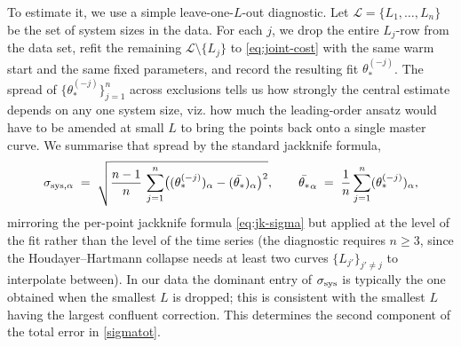 \documentclass[pra,aps,twocolumn,groupedaddress,superscriptaddress,nofootinbib,preprintnumbers]{revtex4-2}
\begin{document}
\begin{widetext}
		To estimate it, we use a simple leave-one-$L$-out
		diagnostic. Let $\mathcal{L} = \{L_1,\dots,L_n\}$ be the set of system
		sizes in the data. For each $j$, we drop the entire $L_j$-row from
		the data set, refit the remaining $\mathcal{L}\setminus\{L_j\}$ to
		\eqref{eq:joint-cost} with the same warm start and the same fixed
		parameters, and record the resulting fit
		$\theta_*^{(-j)}$. The spread of $\{\theta_*^{(-j)}\}_{j=1}^n$
		across exclusions tells us how strongly the central estimate depends
		on any one system size, viz. how much the leading-order ansatz
		would have to be amended at small $L$ to bring the points back onto a
		single master curve. We summarise that spread by the standard
		jackknife formula,
		\begin{equation}
			\sigma_{{\rm sys},\alpha}
			\;=\;
			\sqrt{
				\frac{n - 1}{n}\,
				\sum_{j=1}^{n}\bigl((\theta_*^{(-j)})_\alpha
				- (\bar{\theta_*})_\alpha\bigr)^2
			},
			\qquad
			\bar{\theta_*}_\alpha
			\;=\; \frac{1}{n}\sum_{j=1}^{n}(\theta_*^{(-j)})_\alpha,
			\label{eq:sigma-sys}
		\end{equation}
		mirroring the per-point jackknife formula \eqref{eq:jk-sigma} but
		applied at the level of the fit rather than the level of the time
		series (the diagnostic requires $n \geq 3$, since the
		Houdayer--Hartmann collapse needs at least two curves
		$\{L_{j'}\}_{j' \neq j}$ to interpolate between).
		In our data the dominant entry of $\sigma_{\rm sys}$ is typically the
		one obtained when the smallest $L$ is dropped; this is consistent with
		the smallest $L$ having the largest confluent correction. This determines the second component of the total error in \eqref{sigmatot}. 
		
		
		

\end{widetext}
\end{document}
